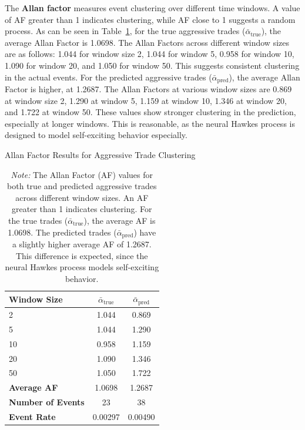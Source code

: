 The \textbf{Allan factor} measures event clustering over different time windows. A value of AF greater than 1 indicates clustering, while AF close to 1 suggests a random process. As can be seen in Table~\ref{tb:allan-factor}, for the true aggressive trades ($\bar{\alpha}_\text{true}$), the average Allan Factor is 1.0698. The Allan Factors across different window sizes are as follows: 1.044 for window size 2, 1.044 for window 5, 0.958 for window 10, 1.090 for window 20, and 1.050 for window 50. This suggests consistent clustering in the actual events. For the predicted aggressive trades ($\bar{\alpha}_\text{pred}$), the average Allan Factor is higher, at 1.2687. The Allan Factors at various window sizes are 0.869 at window size 2, 1.290 at window 5, 1.159 at window 10, 1.346 at window 20, and 1.722 at window 50. These values show stronger clustering in the prediction, especially at longer windows. This is reasonable, as the neural Hawkes process is designed to model self-exciting behavior especially.

\begin{table}[tbp]
    \centering
    \caption{Allan Factor Results for Aggressive Trade Clustering}
    \caption*{\textit{Note:} The Allan Factor (AF) values for both true and predicted aggressive trades across different window sizes. An AF greater than 1 indicates clustering. For the true trades ($\bar{\alpha}_\text{true}$), the average AF is 1.0698. The predicted trades ($\bar{\alpha}_\text{pred}$) have a slightly higher average AF of 1.2687. This difference is expected, since the neural Hawkes process models self-exciting behavior.}
    \label{tb:allan-factor}
    \begin{tabular}{lcc}
    \toprule
    \textbf{Window Size} & $\bar{\alpha}_\text{true}$ & $\bar{\alpha}_\text{pred}$\\
    \midrule
    2   & 1.044 & 0.869 \\
    5   & 1.044 & 1.290 \\
    10  & 0.958 & 1.159 \\
    20  & 1.090 & 1.346 \\
    50  & 1.050 & 1.722 \\
    \midrule
    \textbf{Average AF} & 1.0698 & 1.2687 \\
    \textbf{Number of Events} & 23 & 38 \\
    \textbf{Event Rate} & 0.00297 & 0.00490 \\
    \bottomrule
    \end{tabular}
\end{table}

